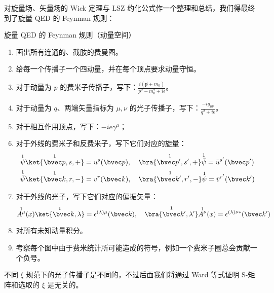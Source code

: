 
对旋量场、矢量场的 Wick 定理与 LSZ 约化公式作一个整理和总结，我们得最终到了旋量 QED 的 Feynman 规则：
\begin{theorem}{旋量 QED 的 Feynman 规则（动量空间）}

\begin{enumerate}
\item 画出所有连通的、截肢的费曼图。
\item 给每一个传播子一个四动量，并在每个顶点要求动量守恒。
\item 对于动量为 $p$ 的费米子传播子，写下：$\frac{i(\not p+m_0)}{p^2-m_0^2 + i\epsilon}$。
\item 对于动量为 $q$、两端矢量指标为 $\mu,\nu$ 的光子传播子，写下：$\frac{-ig_{\mu\nu}}{q^2 + i\epsilon}$。
\item 对于相互作用顶点，写下：$-ie\gamma^\mu$；
\item 对于外线的费米子和反费米子，写下它们对应的旋量：
\begin{align*}
&\overset{1}{\psi}\overset{1}{\ket{\bvec p,s,+}}=u^s(\bvec p),\quad \overset{1}{\bra{\bvec p',s',+}} \overset{1}{\bar\psi}=\bar u^{s'}(\bvec p')\\
&\overset{1}{\bar\psi}\overset{1}{\ket{\bvec k,r,-}}=v^{r}(\bvec k),\quad \overset{1}{\bra{\bvec k',r',-}} \overset{1}{\psi}=\bar v^{r'}(\bvec k')
\end{align*}
\item 对于外线的光子，写下它们对应的偏振矢量：
\[
\overset{1}{A^\mu}(x) \overset{1}{\ket{\bvec k,\lambda}}=\epsilon^{(\lambda)\mu}(\bvec k),\quad \overset{1}{\bra{\bvec k',\lambda'}}\overset{1}{A^\nu}(x)=\epsilon^{(\lambda)\nu*}(\bvec k')
\]
\item 
对所有未知动量积分。
\item 
考察每个图中由于费米统计所可能造成的符号，例如一个费米子圈总会贡献一个负号。
\end{enumerate}
\end{theorem}
不同 $\xi$ 规范下的光子传播子是不同的，不过后面我们将通过 Ward 等式证明 S-矩阵和选取的 $\xi$ 是无关的。
